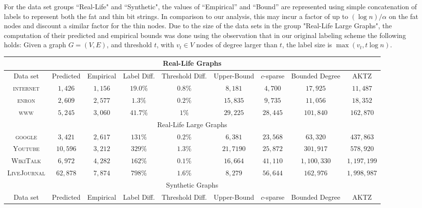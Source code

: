 For the data set groups ``Real-Life" and ``Synthetic", the values of  ``Empirical'' and  ``Bound'' are represented using simple concatenation of labels to represent both the fat and thin bit strings. 
In comparison to our analysis, this may incur a factor of up to $(\log n)/\alpha$  on the fat nodes and discount a similar factor for the thin nodes.
Due to the size of the data sets in the group  "Real-Life Large Graphs", the computation of their predicted and empirical bounds was done using the observation that in our original labeling scheme the following holds: Given a  graph $G=(V,E)$, and threshold $t$, with $v_t \in V$ nodes of degree larger than $t$, the label size is $\max{(v_t,t \log n)}$. 

\begin{table}
\small
\begin{tabular}{ccccccccc}
\hline \multicolumn{9}{c}{Real-Life Graphs}\\\hline
Data set&Predicted &Empirical & Label Diff. & Threshold Diff.   & Upper-Bound     &$c$-sparse &Bounded Degree \cite{adjiashvili2014labeling} &AKTZ \cite{alstrup2014adjacency}\\\hline
\textsc{internet}   &$1,426$    &$1,156$  & $19.0\%$  & $0.8\%$  & $8,181 $  &$4,700$      &$17,925$  &$11,487$\\
\textsc{enron}      &$2,609$    &$2,577$  & $1.3\%$ & $0.2\%$   & $15,835 $ &$9,735$      &$11,056$  &$18,352$\\
\textsc{www}        &$5,245$    &$3,060$  & $41.7\%$  & $1\%$  & $29,225 $ &$28,445$     &$101,840$ &$162,870$ \\
\hline \multicolumn{9}{c}{Real-Life Large Graphs}\\\hline
\textsc{google} & $3,421$ & $2,617$ & $131\%$ & $0.2\%$ & $6,381$ & $23,568$ & $63,320$ & $437,863$\\
\textsc{Youtube}        &$10,596$    &$3,212$  & $329\%$  & $1.3\%$  & $21,7190$ &$25,872$     &$301,917$ &$578,920$ \\
\textsc{WikiTalk}       & $6,972$ & $4,282$ & $162\%$ & $0.1\%$ & $16,664$ & $41,110$ & $1,100,330$ & $1,197,199$\\ 
\textsc{LiveJournal}        &$62,878$    &$7,874$  & $798\%$  & $1.6\%$  & $8,279$ &$56,644$     &$162,976$ &$1,998,987$ \\\hline
\multicolumn{9}{c}{Synthetic Graphs}\\\hline
Data set&Predicted &Empirical & Label Diff. & Threshold Diff.   & Upper-Bound     &$c$-sparse &Bounded Degree \cite{adjiashvili2014labeling} &AKTZ \cite{alstrup2014adjacency}\\\hline

\end{tabular}
\end{table}
